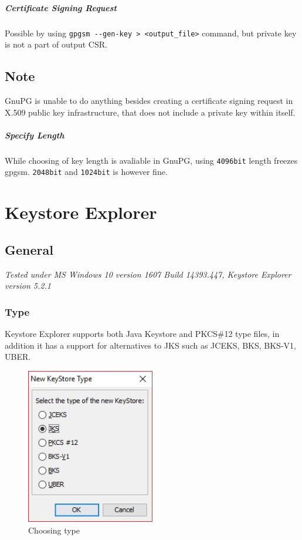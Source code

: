 \documentclass[10pt, a4paper]{report}
\begin{document}
      \paragraph{Certificate Signing Request}
Possible by using \verb+gpgsm --gen-key > <output_file>+ command, but private key is not a part of output CSR.     
\section{Note}
GnuPG is unable to do anything besides creating a certificate signing request in X.509 public key infrastructure, that does not include a private key within itself.
	\paragraph{Specify Length}
While choosing of key length is avaliable in GnuPG, using \verb+4096bit+ length freezes gpgsm. \verb+2048bit+ and \verb+1024bit+ is however fine.
\chapter{Keystore Explorer}

\section{General}

\textit{Tested under MS Windows 10 version 1607 Build 14393.447, Keystore Explorer version 5.2.1}

  \subsection{Type}
Keystore Explorer supports both Java Keystore and PKCS\#12 type files, in addition it has a support for alternatives to JKS such as JCEKS, BKS, BKS-V1, UBER.
\begin{figure}[!htbp]
 \caption{Choosing type}
 \centering
  \includegraphics[width=0.5\textwidth]{../Dependancies/Keystore_Explorer/Type.jpg}
\end{figure}
  
\end{document}
